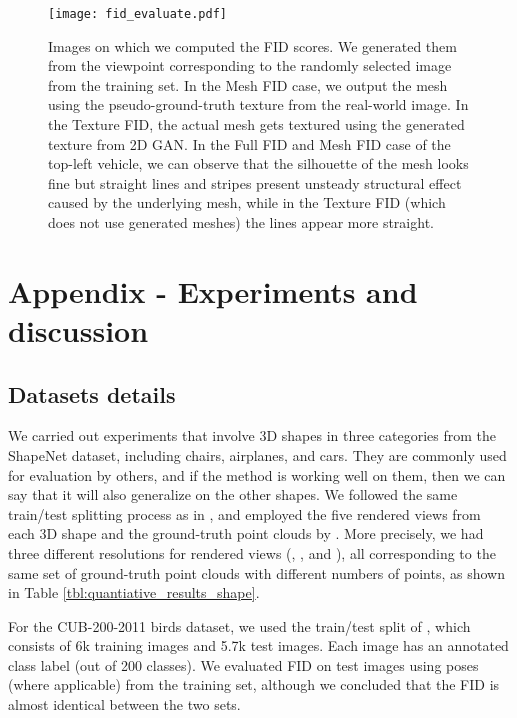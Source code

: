 \documentclass[runningheads]{llncs}
\begin{document}
\begin{figure*}[hbt!]
\centering
\setlength{\abovecaptionskip}{3pt}
 \texttt{[image: fid\_evaluate.pdf]}
 \caption{Images on which we computed the FID scores. We generated them from the viewpoint corresponding to the randomly selected image from the training set. In the Mesh FID case, we output the mesh using the pseudo-ground-truth texture from the real-world image. In the Texture FID, the actual mesh gets textured using the generated texture from 2D GAN. In the Full FID and Mesh FID case of the top-left vehicle, we can observe that the silhouette of the mesh looks fine but straight lines and stripes present unsteady structural effect caused by the underlying mesh, while in the Texture FID (which does not use generated meshes) the lines appear more straight.} 
\label{fig:fid_evaluate}
\end{figure*}

\section{Appendix - Experiments and discussion}
\subsection{Datasets details}
We carried out experiments that involve 3D shapes in three categories from the ShapeNet \cite{chang2015shapenet} dataset, including chairs, airplanes, and cars. They are commonly used for evaluation by others, and if the method is working well on them, then we can say that it will also generalize on the other shapes.  We followed the same train/test splitting process as in \cite{DBLP:journals/corr/abs-1810-09381}, and employed the five rendered views from each 3D shape and the ground-truth point clouds by \cite{DBLP:journals/corr/abs-1810-09381}. More precisely, we had three different resolutions for rendered views (, , and ), all corresponding to the same set of ground-truth point clouds with different numbers of points, as shown in Table \ref{tbl:quantiative_results_shape}.

For the CUB-200-2011 birds \cite{Wah2011TheCB} dataset, we used the train/test split of \cite{kanazawa2018learning}, which consists of 6k training images and {5.7k} test images. Each image has an annotated class label (out of 200 classes). We evaluated FID on test images using poses (where applicable) from the training set, although we concluded that the FID is almost identical between the two sets.
\end{document}
